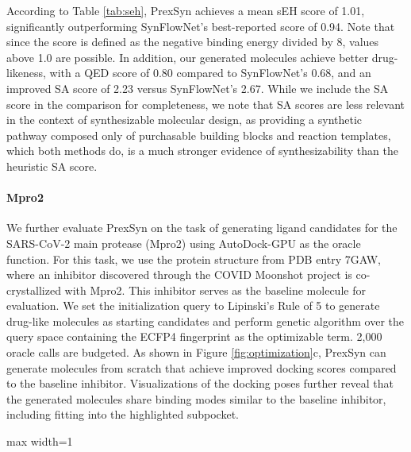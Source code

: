 According to Table \ref{tab:seh}, PrexSyn achieves a mean sEH score of 1.01, significantly outperforming SynFlowNet's best-reported score of 0.94.
Note that since the score is defined as the negative binding energy divided by 8, values above 1.0 are possible.
In addition, our generated molecules achieve better drug-likeness, with a QED score of 0.80 compared to SynFlowNet's 0.68, and an improved SA score of 2.23 versus SynFlowNet's 2.67.
While we include the SA score \citep{ertl2009estimation} in the comparison for completeness, we note that SA scores are less relevant in the context of synthesizable molecular design, as providing a synthetic pathway composed only of purchasable building blocks and reaction templates, which both methods do, is a much stronger evidence of synthesizability than the heuristic SA score.

\paragraph{Mpro2}

We further evaluate PrexSyn on the task of generating ligand candidates for the SARS-CoV-2 main protease (Mpro2) using AutoDock-GPU \citep{autodockgpu} as the oracle function.
For this task, we use the protein structure from PDB entry 7GAW, where an inhibitor discovered through the COVID Moonshot project \citep{boby2023open} is co-crystallized with Mpro2. This inhibitor serves as the baseline molecule for evaluation.
We set the initialization query to Lipinski's Rule of 5 to generate drug-like molecules as starting candidates and perform genetic algorithm over the query space containing the ECFP4 fingerprint as the optimizable term.
2,000 oracle calls are budgeted.
As shown in Figure \ref{fig:optimization}c, PrexSyn can generate molecules from scratch that achieve improved docking scores compared to the baseline inhibitor. Visualizations of the docking poses further reveal that the generated molecules share binding modes similar to the baseline inhibitor, including fitting into the highlighted subpocket.


\begin{table}[t]
  \small
  \centering
  \caption{
    sEH docking-based molecular design results.
    PrexSyn outperforms all the baselines in  sEH and QED scores. 
  }
  \label{tab:seh}
  \begin{adjustbox}{max width=1\linewidth}
    
  \end{adjustbox}
\end{table}
